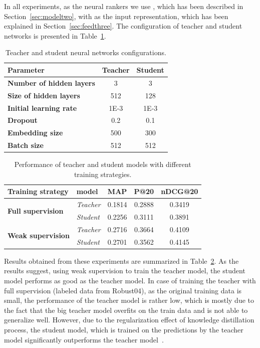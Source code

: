 In all experiments, as the neural rankers we use \modeltwo, which has been described in Section~\ref{sec:modeltwo}, with \Feedthree as the input representation, which has been explained in Section~\ref{sec:feedthree}.
The configuration of teacher and student networks is presented in Table~\ref{tbl:cfg}.
\begin{table}[t]
\centering
\caption{Teacher and student neural networks configurations.}
\begin{tabular}{lcc} 
\toprule
\bf Parameter & \bf Teacher & \bf Student  \\
\midrule
\textbf{Number of hidden layers} & 3 & 3  \\
\textbf{Size of hidden layers} & 512 & 128 \\
\textbf{Initial learning rate} & 1E-3 & 1E-3 \\
\textbf{Dropout} & 0.2 & 0.1 \\
\textbf{Embedding size} & 500 & 300 \\
\textbf{Batch size} & 512 & 512  \\
\bottomrule
\end{tabular}
\label{tbl:cfg}
\end{table}

\begin{table}[t]
\centering
\caption{\label{tbl_res1}Performance of teacher and student models with different training strategies.}
\vspace{5pt}
\begin{adjustbox}{max width=\textwidth}
\begin{tabular}{l l c c c}
\toprule
\bf Training strategy & \bf model & \textbf{MAP} & \textbf{P@20} & \textbf{nDCG@20} 
\\ \midrule
\multirow{2}{*}{{\textbf{Full supervision}}} & {\textit{Teacher}} 
& 0.1814 & 0.2888 & 0.3419 
\\
& {\textit{Student}} 
& 0.2256 & 0.3111 & 0.3891 
\\ \midrule
\multirow{2}{*}{{\textbf{Weak supervision}}} & {\textit{Teacher}} 
& 0.2716 & 0.3664 & 0.4109 
\\ 
& {\textit{Student}} 
& 0.2701 & 0.3562 & 0.4145 
\\ \bottomrule
\end{tabular}
\end{adjustbox}
\end{table}

Results obtained from these experiments are summarized in Table~\ref{tbl_res1}. As the results suggest, using weak supervision to train the teacher model, the student model performs as good as the teacher model. In case of training the teacher with full supervision (labeled data from Robust04), as the original training data is small, the performance of the teacher model is rather low, which is mostly due to the fact that the big teacher model overfits on the train data and is not able to generalize well. 
However, due to the regularization effect of knowledge distillation process, the student model, which is trained on the predictions by the teacher model significantly outperforms the teacher model~\citep{Hinton:2015,Romero:2014}.

